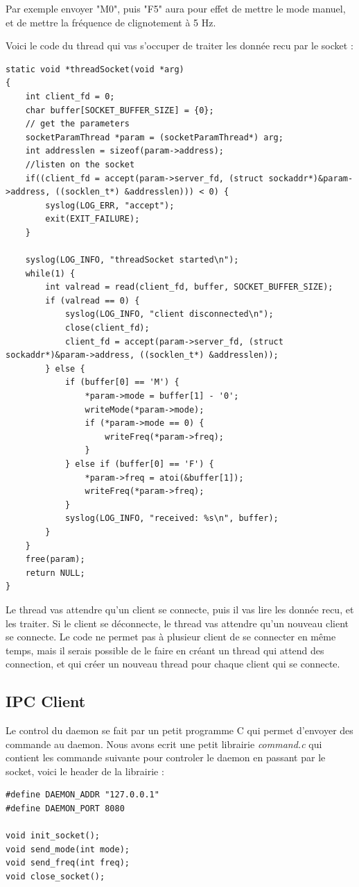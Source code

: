 \documentclass[
	a4paper, %
	10pt, %
]{CSUniSchoolLabReport}
\begin{document}
Par exemple envoyer "M0", puis "F5" aura pour effet de mettre le mode manuel, et de mettre la fréquence de clignotement à 5 Hz.

Voici le code du thread qui vas s'occuper de traiter les donnée recu par le socket : \\
\begin{lstlisting}[style=CStyle]
static void *threadSocket(void *arg)
{
	int client_fd = 0;
	char buffer[SOCKET_BUFFER_SIZE] = {0};
	// get the parameters
	socketParamThread *param = (socketParamThread*) arg;
	int addresslen = sizeof(param->address);
	//listen on the socket
	if((client_fd = accept(param->server_fd, (struct sockaddr*)&param->address, ((socklen_t*) &addresslen))) < 0) {
		syslog(LOG_ERR, "accept");
		exit(EXIT_FAILURE);
	}

	syslog(LOG_INFO, "threadSocket started\n");
	while(1) {
		int valread = read(client_fd, buffer, SOCKET_BUFFER_SIZE);
		if (valread == 0) {
			syslog(LOG_INFO, "client disconnected\n");
			close(client_fd);
			client_fd = accept(param->server_fd, (struct sockaddr*)&param->address, ((socklen_t*) &addresslen));
		} else {
			if (buffer[0] == 'M') {
				*param->mode = buffer[1] - '0';
				writeMode(*param->mode);
				if (*param->mode == 0) {
					writeFreq(*param->freq);
				}
			} else if (buffer[0] == 'F') {
				*param->freq = atoi(&buffer[1]);
				writeFreq(*param->freq);
			}
			syslog(LOG_INFO, "received: %s\n", buffer);
		}
	}
	free(param);
	return NULL;
}
\end{lstlisting}
Le thread vas attendre qu'un client se connecte, puis il vas lire les donnée recu, et les traiter.
Si le client se déconnecte, le thread vas attendre qu'un nouveau client se connecte.
Le code ne permet pas à plusieur client de se connecter en même temps, mais il serais possible de le faire en créant un thread qui attend des connection, et qui créer un nouveau thread pour chaque client qui se connecte. \\

\subsection{IPC Client}\label{IPCClient}
Le control du daemon se fait par un petit programme C qui permet d'envoyer des commande au daemon.
Nous avons ecrit une petit librairie \textit{command.c} qui contient les commande suivante pour controler le daemon en passant par le socket, voici le header de la librairie : \\
\begin{lstlisting}[style=CStyle]
#define DAEMON_ADDR "127.0.0.1"
#define DAEMON_PORT 8080

void init_socket();
void send_mode(int mode);
void send_freq(int freq);
void close_socket();
\end{lstlisting}
\end{document}
